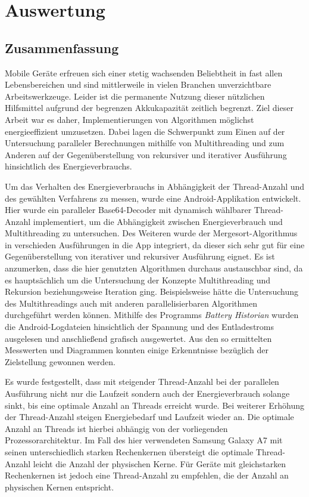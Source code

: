\chapter{Auswertung}

\section{Zusammenfassung}

Mobile Geräte erfreuen sich einer stetig wachsenden Beliebtheit in fast allen Lebensbereichen und sind mittlerweile in vielen Branchen unverzichtbare Arbeitswerkzeuge. Leider ist die permanente Nutzung dieser nützlichen Hilfsmittel aufgrund der begrenzen Akkukapazität zeitlich begrenzt. Ziel dieser Arbeit war es daher, Implementierungen von Algorithmen möglichst  energieeffizient umzusetzen. Dabei lagen die Schwerpunkt zum Einen auf der Untersuchung paralleler Berechnungen mithilfe von Multithreading und zum Anderen auf der Gegenüberstellung von rekursiver und iterativer Ausführung hinsichtlich des Energieverbrauchs.

Um das Verhalten des Energieverbrauchs in Abhängigkeit der Thread-Anzahl und des gewählten Verfahrens zu messen, wurde eine Android-Applikation entwickelt. Hier wurde ein paralleler Base64-Decoder mit dynamisch wählbarer Thread-Anzahl implementiert, um die Abhängigkeit zwischen Energieverbrauch und Multithreading zu untersuchen. Des Weiteren wurde der Mergesort-Algorithmus in verschieden Ausführungen in die App integriert, da dieser sich sehr gut für eine Gegenüberstellung von iterativer und rekursiver Ausführung eignet. Es ist anzumerken, dass die hier genutzten Algorithmen durchaus austauschbar sind, da es hauptsächlich um die Untersuchung der Konzepte Multithreading und Rekursion beziehungsweise Iteration ging. Beispielsweise hätte die Untersuchung des Multithreadings auch mit anderen parallelisierbaren Algorithmen durchgeführt werden können. Mithilfe des Programms \emph{Battery Historian} wurden die Android-Logdateien hinsichtlich der Spannung und des Entladestroms ausgelesen und anschließend grafisch ausgewertet. Aus den so ermittelten Messwerten und Diagrammen konnten einige Erkenntnisse bezüglich der Zielstellung gewonnen werden.

Es wurde festgestellt, dass mit steigender Thread-Anzahl bei der parallelen Ausführung nicht nur die Laufzeit sondern auch der Energieverbrauch solange sinkt, bis eine optimale Anzahl an Threads erreicht wurde. Bei weiterer Erhöhung der Thread-Anzahl steigen Energiebedarf und Laufzeit wieder an. Die optimale Anzahl an Threads ist hierbei abhängig von der vorliegenden Prozessorarchitektur. Im Fall des hier verwendeten Samsung Galaxy A7 mit seinen unterschiedlich starken Rechenkernen übersteigt die optimale Thread-Anzahl leicht die Anzahl der physischen Kerne. Für Geräte mit gleichstarken Rechenkernen ist jedoch eine Thread-Anzahl zu empfehlen, die der Anzahl an physischen Kernen entspricht.

